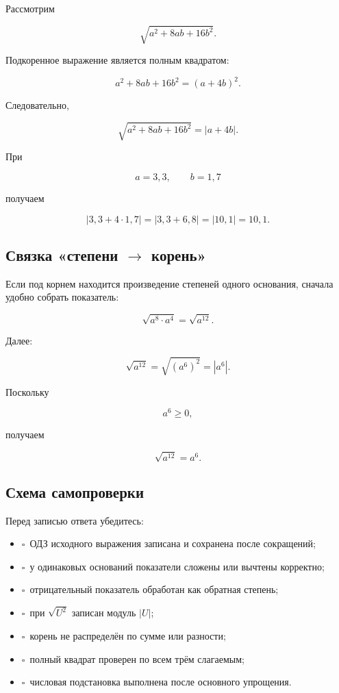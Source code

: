 \documentclass[a4paper,12pt]{article}
\newcommand{\checkitem}{\(\square\)}
\begin{document}
Рассмотрим

\[
\sqrt{a^2+8ab+16b^2}.
\]

Подкоренное выражение является полным квадратом:

\[
a^2+8ab+16b^2
=
(a+4b)^2.
\]

Следовательно,

\[
\sqrt{a^2+8ab+16b^2}
=
|a+4b|.
\]

При

\[
a=3{,}3,
\qquad
b=1{,}7
\]

получаем

\[
|3{,}3+4\cdot1{,}7|
=
|3{,}3+6{,}8|
=
|10{,}1|
=
10{,}1.
\]

\subsection{Связка «степени $\rightarrow$ корень»}

Если под корнем находится произведение степеней
одного основания, сначала удобно собрать показатель:

\[
\sqrt{a^8\cdot a^4}
=
\sqrt{a^{12}}.
\]

Далее:

\[
\sqrt{a^{12}}
=
\sqrt{(a^6)^2}
=
|a^6|.
\]

Поскольку

\[
a^6\ge0,
\]

получаем

\[
\sqrt{a^{12}}
=
a^6.
\]

\subsection{Схема самопроверки}

Перед записью ответа убедитесь:

\begin{itemize}

\item
\checkitem\
ОДЗ исходного выражения записана
и сохранена после сокращений;

\item
\checkitem\
у одинаковых оснований показатели
сложены или вычтены корректно;

\item
\checkitem\
отрицательный показатель обработан
как обратная степень;

\item
\checkitem\
при $\sqrt{U^2}$ записан модуль $|U|$;

\item
\checkitem\
корень не распределён по сумме или разности;

\item
\checkitem\
полный квадрат проверен по всем трём слагаемым;

\item
\checkitem\
числовая подстановка выполнена
после основного упрощения.

\end{itemize}
\end{document}
